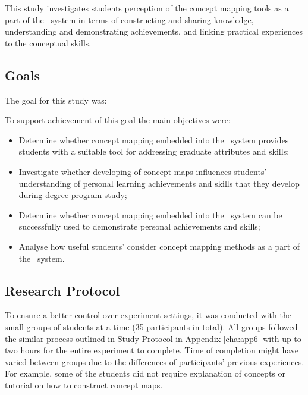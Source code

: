 This study investigates students perception of the concept mapping tools as a
part of the \ep~system in terms of constructing and sharing knowledge,
understanding and demonstrating achievements, and linking practical experiences
to the conceptual skills.

\subsection{Goals}
The goal for this study was:


To support achievement of this goal the main objectives were:

\begin{itemize}
  \item Determine whether concept mapping embedded into the \ep~system provides
  students with a suitable tool for addressing graduate attributes and \LLLs
  skills;
  \item Investigate whether developing of concept maps influences students'
  understanding of personal learning achievements and skills that they develop
  during degree program study;
  \item Determine whether concept mapping embedded into the \ep~system can be
  successfully used to demonstrate personal achievements and skills;
  \item Analyse how useful students' consider concept mapping methods as a part
  of the \ep~system.
\end{itemize}

\subsection{Research Protocol}

To ensure a better control over experiment settings, it was conducted with the
small groups of students at a time (35 participants in total). All groups
followed the similar process outlined in Study Protocol in Appendix
\ref{cha:app6} with up to two hours for the entire experiment to complete. Time
of completion might have varied between groups due to the differences of
participants' previous experiences. For example, some of the students did not
require explanation of \LLLs concepts or tutorial on how to construct concept
maps.

